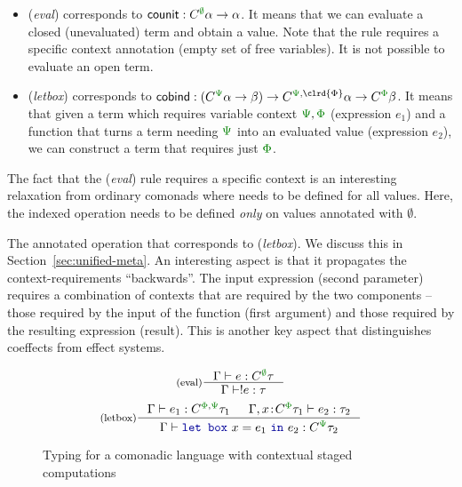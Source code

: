 \begin{itemize}
\item (\emph{eval}) corresponds to $\ident{counit} : \ctyp{\cclrd{\emptyset}}{\alpha} \rightarrow \alpha$. 
  It means that we can evaluate a closed (unevaluated) term and obtain a value. Note that the 
  rule requires a specific context annotation (empty set of free variables). 
  It is not possible to evaluate an open term.

\item (\emph{letbox}) corresponds to $\ident{cobind} : (\ctyp{\cclrd{\Psi}}{\alpha} \rightarrow \beta) 
  \rightarrow \ctyp{\cclrd{\Psi}, \clrd{\Phi}}{\alpha} \rightarrow \ctyp{\cclrd{\Phi}}{\beta}$. 
  It means that given a term which requires variable context $\cclrd{\Psi}, \cclrd{\Phi}$ 
  (expression $e_1$) and a function that turns a term needing $\cclrd{\Psi}$ into an evaluated 
  value (expression $e_2$), we can construct a term that requires just $\cclrd{\Phi}$.
\end{itemize}

\noindent
The fact that the (\emph{eval}) rule requires a specific context is an interesting relaxation
from ordinary comonads where  needs to be defined for all values. Here, the indexed
 operation needs to be defined \emph{only} on values annotated with $\emptyset$.

The annotated  operation that corresponds to (\emph{letbox}). We discuss this 
in Section~\ref{sec:unified-meta}. An interesting aspect is that it propagates the 
context-requirements ``backwards''. The input expression (second parameter) requires a 
combination of contexts that are required by the two components -- those required by the 
input of the function (first argument) and those required by the resulting expression (result). 
This is another key aspect that distinguishes coeffects from effect systems.


\begin{figure}
\begin{equation*}
\inference[(eval)]
  {\Gamma \vdash e : \ctyp{\cclrd{\emptyset}}{\tau}}
  {\Gamma \vdash !e : \tau}
\end{equation*}
\begin{equation*}
\inference[(letbox)]
  { \Gamma \vdash e_1 : \ctyp{\cclrd{\Phi}, \cclrd{\Psi}}{\tau_1} & 
    \Gamma, x\!:\!\ctyp{\cclrd{\Phi}}{\tau_1} \vdash e_2 : \tau_2 }
  { \Gamma \vdash \kvd{let~box}~x=e_1~\kvd{in}~e_2 : \ctyp{\cclrd{\Psi}}{\tau_2}}
\end{equation*}

\caption{Typing for a comonadic language with contextual staged computations}
\label{fig:modal-meta}
\end{figure}

